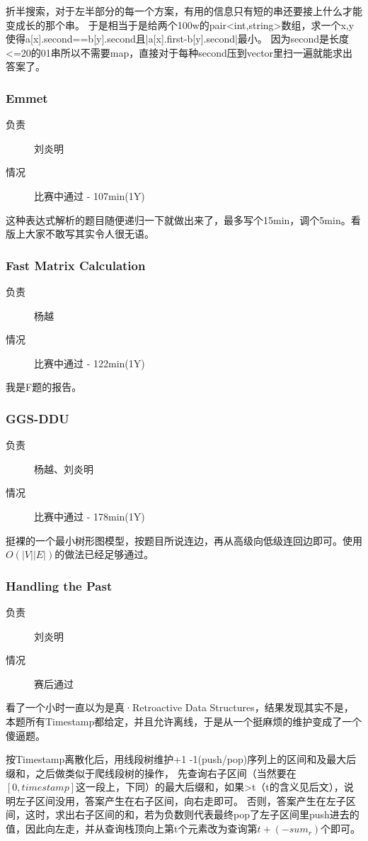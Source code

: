 \documentclass[a4paper, 11pt, nofonts, nocap, fancyhdr]{ctexart}
\newcommand{\problem}[1]{\subsubsection{#1}}
\begin{document}
折半搜索，对于左半部分的每一个方案，有用的信息只有短的串还要接上什么才能变成长的那个串。
于是相当于是给两个100w的pair<int,string>数组，求一个x,y使得a[x].second==b[y].second且|a[x].first-b[y].second|最小。
因为second是长度<=20的01串所以不需要map，直接对于每种second压到vector里扫一遍就能求出答案了。

\problem{Emmet}

\begin{description}
\item[负责] 刘炎明
\item[情况] 比赛中通过 - 107min(1Y)
\end{description}

这种表达式解析的题目随便递归一下就做出来了，最多写个15min，调个5min。看版上大家不敢写其实令人很无语。

\problem{Fast Matrix Calculation}

\begin{description}
\item[负责] 杨越
\item[情况] 比赛中通过 - 122min(1Y)
\end{description}

我是F题的报告。

\problem{GGS-DDU}

\begin{description}
\item[负责] 杨越、刘炎明
\item[情况] 比赛中通过 - 178min(1Y)
\end{description}

挺裸的一个最小树形图模型，按题目所说连边，再从高级向低级连回边即可。使用$O(|V||E|)$的做法已经足够通过。

\problem{Handling the Past}

\begin{description}
\item[负责] 刘炎明
\item[情况] 赛后通过
\end{description}

看了一个小时一直以为是真·Retroactive Data Structures，结果发现其实不是，本题所有Timestamp都给定，并且允许离线，于是从一个挺麻烦的维护变成了一个傻逼题。

按Timestamp离散化后，用线段树维护+1 -1(push/pop)序列上的区间和及最大后缀和，之后做类似于爬线段树的操作，
先查询右子区间（当然要在$[0,timestamp]$这一段上，下同）的最大后缀和，如果>t（t的含义见后文），说明左子区间没用，答案产生在右子区间，向右走即可。
否则，答案产生在左子区间，这时，求出右子区间的和，若为负数则代表最终pop了左子区间里push进去的值，因此向左走，并从查询栈顶向上第t个元素改为查询第$t + (-sum_r)$个即可。
\end{document}
